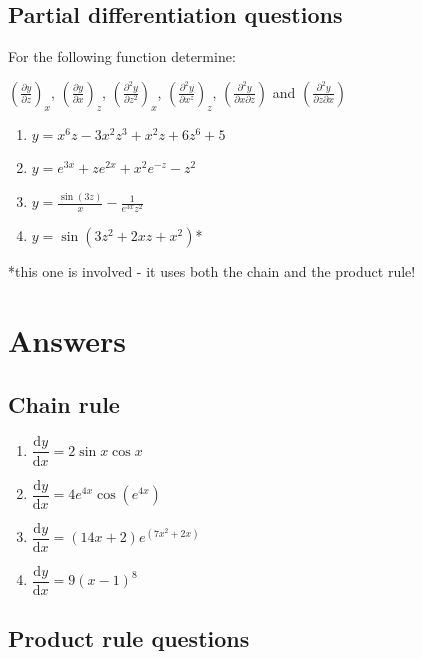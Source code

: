 \documentclass[
]{book}
\providecommand{\tightlist}{%
  \setlength{\itemsep}{0pt}\setlength{\parskip}{0pt}}
\begin{document}
\hypertarget{partial-differentiation-questions}{%
\subsection{Partial differentiation questions}\label{partial-differentiation-questions}}

For the following function determine:

\(\left(\frac{\partial y}{\partial z}\right)_x\), \(\left(\frac{\partial y}{\partial x}\right)_z\), \(\left(\frac{\partial^2 y}{\partial z^2}\right)_x\), \(\left(\frac{\partial^2 y}{\partial x^z}\right)_z\), \(\left(\frac{\partial^2 y}{\partial x \partial z}\right)\) and \(\left(\frac{\partial^2 y}{\partial z \partial x}\right)\)

\begin{enumerate}
\def\labelenumi{\arabic{enumi}.}
\tightlist
\item
  \(y = x^6z -3x^2z^3+x^2z+6z^6+5\)
\item
  \(y = e^{3x}+ze^{2x}+x^2e^{-z}-z^2\)
\item
  \(y=\frac{\sin (3z)}{x}-\frac{1}{e^{3x}z^2}\)
\item
  \(y=\sin(3z^2+2xz+x^2)\)*
\end{enumerate}

*this one is involved - it uses both the chain and the product rule!

\hypertarget{sec:Answers5}{%
\section{Answers}\label{sec:Answers5}}

\hypertarget{chain-rule-1}{%
\subsection{Chain rule}\label{chain-rule-1}}

\begin{enumerate}
\def\labelenumi{\arabic{enumi}.}
\tightlist
\item
  \(\dfrac{\textrm{d}y}{\textrm{d}x}= 2 \sin x \cos x\)
\item
  \(\dfrac{\textrm{d}y}{\textrm{d}x}=4e^{4x}\cos (e^{4x})\)
\item
  \(\dfrac{\textrm{d}y}{\textrm{d}x}= (14x+2)e^{(7x^2 + 2x)}\)
\item
  \(\dfrac{\textrm{d}y}{\textrm{d}x}= 9 (x-1)^8\)
\end{enumerate}

\hypertarget{product-rule-questions-1}{%
\subsection{Product rule questions}\label{product-rule-questions-1}}
\end{document}
